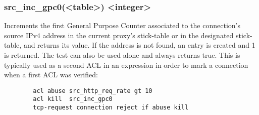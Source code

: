 \subsubsection{src\_inc\_gpc0(<table>) <integer>}
  Increments the first General Purpose Counter associated to the connection's
  source IPv4 address in the current proxy's stick-table or in the designated
  stick-table, and returns its value. If the address is not found, an entry is
  created and 1 is returned. The test can also be used alone and always returns
  true. This is typically used as a second ACL in an expression in order to
  mark a connection when a first ACL was verified:
  \begin{verbatim}
        acl abuse src_http_req_rate gt 10
        acl kill  src_inc_gpc0
        tcp-request connection reject if abuse kill
  \end{verbatim}

